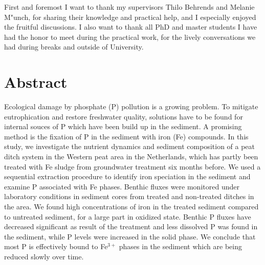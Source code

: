 \documentclass[a4paper,11pt]{article}
\begin{document}
First and foremost I want to thank my supervisors Thilo Behrends and Melanie M"unch, for sharing their knowledge and practical help, and I especially enjoyed the fruitful discussions. I also want to thank all PhD and master students I have had the honor to meet during the practical work, for the lively conversations we had during breaks and outside of University.
\pagestyle{plain}
\setcounter{page}{1}    %

\newpage
\hypertarget{abstract}{%
\section*{Abstract}\label{abstract}}

Ecological damage by phosphate (P) pollution is a growing problem. To mitigate eutrophication and restore freshwater quality, solutions have to be found for internal souces of P which have been build up in the sediment. A promising method is the fixation of P in the sediment with iron (Fe) compounds. In this study, we investigate the nutrient dynamics and sediment composition of a peat ditch system in the Western peat area in the Netherlands, which has partly been treated with Fe sludge from groundwater treatment six months before. We used a sequential extraction procedure to identify iron speciation in the sediment and examine P associated with Fe phases. Benthic fluxes were monitored under laboratory conditions in sediment cores from treated and non-treated ditches in the area. We found high concentrations of iron in the treated sediment compared to untreated sediment, for a large part in oxidized state. Benthic P fluxes have decreased significant as result of the treatment and less dissolved P was found in the sediment, while P levels were increased in the solid phase. We conclude that most P is effectively bound to Fe\(^{3+}\) phases in the sediment which are being reduced slowly over time.

\newpage
\tableofcontents
\clearpage


\end{document}
